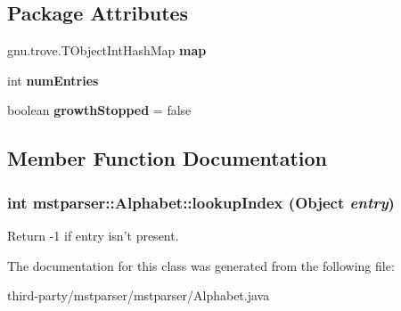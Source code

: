 \subsection*{Package Attributes}
\begin{DoxyCompactItemize}
\item 
\hypertarget{classmstparser_1_1Alphabet_aee577f63bf8d7584ea059587abb18a98}{
gnu.trove.TObjectIntHashMap {\bfseries map}}
\label{classmstparser_1_1Alphabet_aee577f63bf8d7584ea059587abb18a98}

\item 
\hypertarget{classmstparser_1_1Alphabet_a89781049943be9c05005cfa4e7b3cbc1}{
int {\bfseries numEntries}}
\label{classmstparser_1_1Alphabet_a89781049943be9c05005cfa4e7b3cbc1}

\item 
\hypertarget{classmstparser_1_1Alphabet_a48ba6aefb5bf3eb7e53c09c27501c71e}{
boolean {\bfseries growthStopped} = false}
\label{classmstparser_1_1Alphabet_a48ba6aefb5bf3eb7e53c09c27501c71e}

\end{DoxyCompactItemize}


\subsection{Member Function Documentation}
\hypertarget{classmstparser_1_1Alphabet_a76971ecbacfad318bc7a9798effc6192}{
\subsubsection[{lookupIndex}]{\setlength{\rightskip}{0pt plus 5cm}int mstparser::Alphabet::lookupIndex (Object {\em entry})}}
\label{classmstparser_1_1Alphabet_a76971ecbacfad318bc7a9798effc6192}
Return -\/1 if entry isn't present. 

The documentation for this class was generated from the following file:\begin{DoxyCompactItemize}
\item 
third-\/party/mstparser/mstparser/Alphabet.java\end{DoxyCompactItemize}
